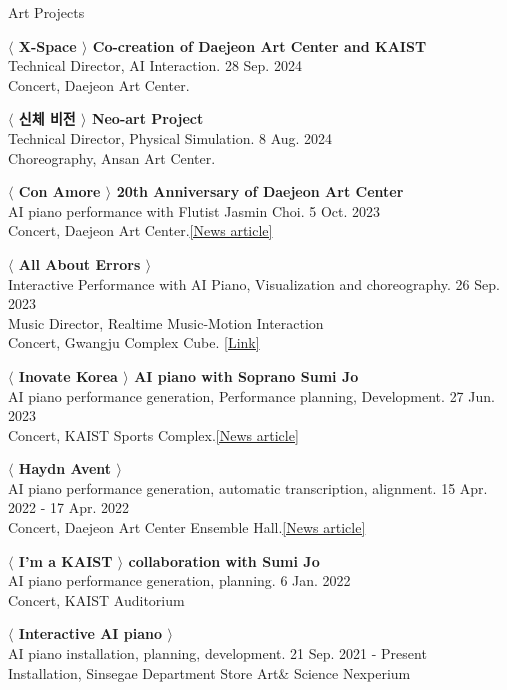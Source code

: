 \documentclass{resume} %
\begin{document}
\begin{rSection}{Art Projects}

{\bf $\langle$ X-Space $\rangle$ Co-creation of Daejeon Art Center and KAIST}\\
Technical Director, AI Interaction. \hfill {28 Sep. 2024}\\
Concert, Daejeon Art Center.

{\bf $\langle$ 신체 비전 $\rangle$ Neo-art Project}\\
Technical Director, Physical Simulation. \hfill {8 Aug. 2024}\\
Choreography, Ansan Art Center.

{\bf $\langle$ Con Amore $\rangle$ 20th Anniversary of Daejeon Art Center}\\
AI piano performance with Flutist Jasmin Choi. \hfill {5 Oct. 2023}\\
Concert, Daejeon Art Center.\href{https://www.kukinews.com/newsView/kuk202310050304}{[News article]}

{\bf $\langle$ All About Errors $\rangle$ }\\
Interactive Performance with AI Piano, Visualization and choreography. \hfill {26 Sep. 2023}
\\Music Director, Realtime Music-Motion Interaction
\\Concert, Gwangju Complex Cube. \href{https://www.taeheonlee.com/all-about-error}{[Link]}

{\bf $\langle$ Inovate Korea $\rangle$ AI piano with Soprano Sumi Jo }\\
AI piano performance generation, Performance planning, Development. \hfill {27 Jun. 2023}\\
Concert, KAIST Sports Complex.\href{https://biz.heraldcorp.com/view.php?ud=20230628000692}{[News article]}

{\bf $\langle$ Haydn Avent $\rangle$}\\
AI piano performance generation, automatic transcription, alignment. \hfill {15 Apr. 2022 - 17 Apr. 2022}\\
Concert, Daejeon Art Center Ensemble Hall.\href{https://www.news1.kr/articles/?4648413}{[News article]}

{\bf $\langle$ I'm a KAIST $\rangle$ collaboration with Sumi Jo}\\
AI piano performance generation, planning. \hfill {6 Jan. 2022}\\
Concert, KAIST Auditorium

{\bf $\langle$ Interactive AI piano $\rangle$}\\
AI piano installation, planning, development. \hfill {21 Sep. 2021 - Present}\\
Installation, Sinsegae Department Store Art\& Science Nexperium


\end{rSection}
\end{document}
